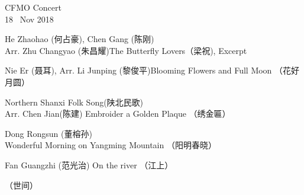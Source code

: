 \documentclass[letter,6pt,poets]{ConcProg}
\begin{document}
\begin{programme}{
    CFMO Concert
\\  {\normalsize 18 ~Nov 2018}
}
  \begin{part}[]
    \begin{composition}{He Zhaohao (何占豪), Chen Gang (陈刚) \\Arr. Zhu Changyao (朱昌耀)}{}{The Butterfly Lovers（梁祝), Excerpt}{}
    \end{composition}
    
    \begin{composition}{Nie Er (聂耳), Arr. Li Junping (黎俊平)}{}{Blooming Flowers and Full Moon （花好月圆）}{}      
    \end{composition}
    
    \begin{composition}{Northern Shanxi Folk Song(陕北民歌)\\Arr. Chen Jian(陈建)} {}{Embroider a Golden Plaque  （绣金匾）}{}
    \end{composition}
    \begin{composition}{Dong Rongsun (董榕孙)} {}{Wonderful Morning on Yangming Mountain  （阳明春晓）
}{}
    \end{composition}
    \begin{composition}{Fan Guangzhi (范光治)} {}{On the river （江上）}{}
                   {}{}
      \end{composition}
     \begin{composition}{} {}{（世间）}{}
                   {}{}
    \end{composition}
    

\end{part}
\end{programme}
\end{document}
